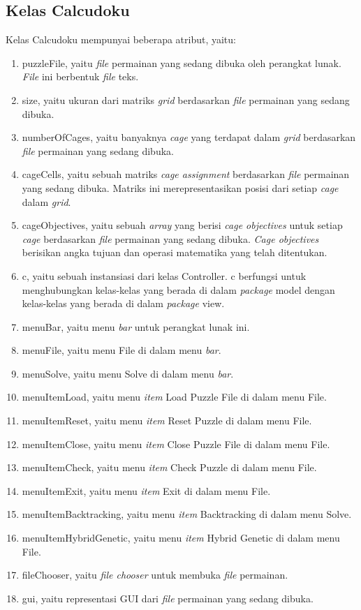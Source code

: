 \subsection{Kelas Calcudoku}
\label{sec:kelascalcudoku}

Kelas Calcudoku mempunyai beberapa atribut, yaitu:

\begin{enumerate}
\item puzzleFile, yaitu \textit{file} permainan yang sedang dibuka oleh perangkat lunak. \textit{File} ini berbentuk \textit{file} teks.
\item size, yaitu ukuran dari matriks \textit{grid} berdasarkan \textit{file} permainan yang sedang dibuka.
\item numberOfCages, yaitu banyaknya \textit{cage} yang terdapat dalam \textit{grid} berdasarkan \textit{file} permainan yang sedang dibuka.
\item cageCells, yaitu sebuah matriks \textit{cage assignment} berdasarkan \textit{file} permainan yang sedang dibuka. Matriks ini merepresentasikan posisi dari setiap \textit{cage} dalam \textit{grid}.
\item cageObjectives, yaitu sebuah \textit{array} yang berisi \textit{cage objectives} untuk setiap \textit{cage} berdasarkan \textit{file} permainan yang sedang dibuka. \textit{Cage objectives} berisikan angka tujuan dan operasi matematika yang telah ditentukan.
\item c, yaitu sebuah instansiasi dari kelas Controller. c berfungsi untuk menghubungkan kelas-kelas yang berada di dalam \textit{package} model dengan kelas-kelas yang berada di dalam \textit{package} view.
\item menuBar, yaitu menu \textit{bar} untuk perangkat lunak ini.
\item menuFile, yaitu menu File di dalam menu \textit{bar}.
\item menuSolve, yaitu menu Solve di dalam menu \textit{bar}.
\item menuItemLoad, yaitu menu \textit{item} Load Puzzle File di dalam menu File.
\item menuItemReset, yaitu menu \textit{item} Reset Puzzle di dalam menu File.
\item menuItemClose, yaitu menu \textit{item} Close Puzzle File di dalam menu File.
\item menuItemCheck, yaitu menu \textit{item} Check Puzzle di dalam menu File.
\item menuItemExit, yaitu menu \textit{item} Exit di dalam menu File.
\item menuItemBacktracking, yaitu menu \textit{item} Backtracking di dalam menu Solve.
\item menuItemHybridGenetic, yaitu menu \textit{item} Hybrid Genetic di dalam menu File.
\item fileChooser, yaitu \textit{file chooser} untuk membuka \textit{file} permainan.
\item gui, yaitu representasi GUI dari \textit{file} permainan yang sedang dibuka.
\end{enumerate}

